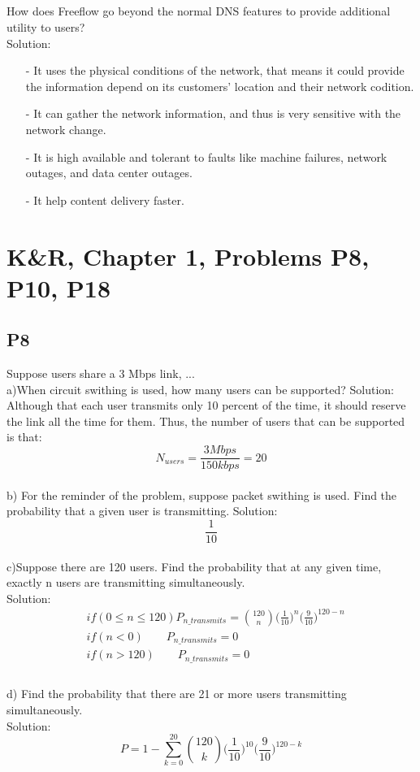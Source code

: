 \documentclass{article}
\begin{document}
\subsection{}
{How does Freeflow go beyond the normal DNS features to provide additional utility to users?}
\\
    Solution:
      \begin{enumerate}
      \item[-]It uses the physical conditions of the network, that means it could provide the information depend on its customers' location and their network codition. 
      \item[-]It can gather the network information, and thus is very sensitive with the network change. 
      \item[-]It is high available and tolerant to faults like machine failures, network outages, and data center outages.
      \item[-]It help content delivery faster.
  \end{enumerate}




\section{K\&R, Chapter 1, Problems P8, P10, P18}
\subsection{P8}
Suppose users share a 3 Mbps link, ...\\
{a)When circuit swithing is used, how many users can be supported?}
Solution:
  Although that each user transmits only 10 percent of the time, it should reserve the link all the time for them. Thus, the number of users that can be supported is that:
    \begin{equation}
    N_{users} = \frac{3 Mbps}{150 kbps} = 20
    \end{equation}
\\
{b) For the reminder of the problem, suppose packet swithing is used. Find the probability that a given user is transmitting.}
Solution:
  $$\frac{1}{10}$$
\\
{c)Suppose there are 120 users. Find the probability that at any given time, exactly n users are transmitting simultaneously.}
\\
    Solution:
  \begin{align}
  & if (0 \leq n \leq 120)   P_{n\_transmits} =  \binom{120}{n} \big(\frac{1}{10}\big)^n \big(\frac{9}{10}\big)^{120-n}\\
  & if (n<0) \qquad P_{n\_transmits} = 0\\
  & if (n>120) \qquad P_{n\_transmits} =  0\\
  \end{align}
\\
{d) Find the probability that there are 21 or more users transmitting simultaneously.}
\\
    Solution:
  \begin{equation}
  P = 1 - \sum^{20}_{k=0}\binom{120}{k} \big(\frac{1}{10}\big)^{10} \big(\frac{9}{10}\big)^{120-k}
  \end{equation}
\end{document}
